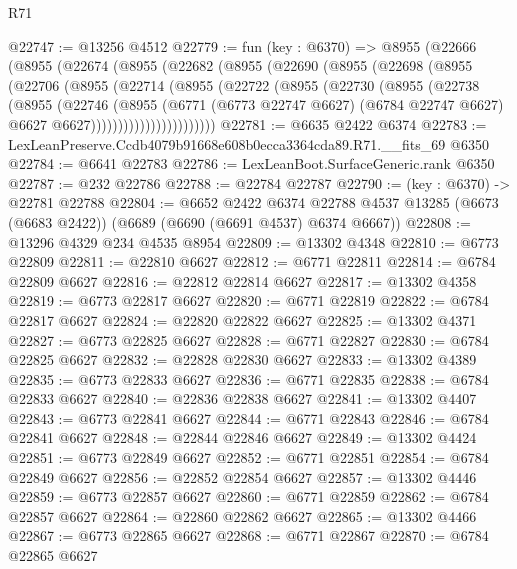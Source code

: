 \begin{lexlean}{R71}
\begin{coremodule}
@22747 := @13256 @4512
@22779 := fun (key : @6370) =>
  @8955
    (@22666
      (@8955
        (@22674
          (@8955
            (@22682
              (@8955
                (@22690
                  (@8955
                    (@22698
                      (@8955
                        (@22706
                          (@8955
                            (@22714
                              (@8955
                                (@22722
                                  (@8955
                                    (@22730
                                      (@8955
                                        (@22738
                                          (@8955
                                            (@22746
                                              (@8955
                                                (@6771
                                                  (@6773 @22747 @6627)
                                                  (@6784 @22747 @6627)
                                                  @6627
                                                  @6627)))))))))))))))))))))))
@22781 := @6635 @2422 @6374
@22783 := LexLeanPreserve.Ccdb4079b91668e608b0ecca3364cda89.R71.__fits_69 @6350
@22784 := @6641 @22783
@22786 := LexLeanBoot.SurfaceGeneric.rank @6350
@22787 := @232 @22786
@22788 := @22784 @22787
@22790 := (key : @6370) -> @22781 @22788
@22804 := @6652
    @2422
    @6374
    @22788
    @4537
    @13285
    (@6673 (@6683 @2422))
    (@6689 (@6690 (@6691 @4537) @6374 @6667))
@22808 := @13296 @4329 @234 @4535 @8954
@22809 := @13302 @4348
@22810 := @6773 @22809
@22811 := @22810 @6627
@22812 := @6771 @22811
@22814 := @6784 @22809 @6627
@22816 := @22812 @22814 @6627
@22817 := @13302 @4358
@22819 := @6773 @22817 @6627
@22820 := @6771 @22819
@22822 := @6784 @22817 @6627
@22824 := @22820 @22822 @6627
@22825 := @13302 @4371
@22827 := @6773 @22825 @6627
@22828 := @6771 @22827
@22830 := @6784 @22825 @6627
@22832 := @22828 @22830 @6627
@22833 := @13302 @4389
@22835 := @6773 @22833 @6627
@22836 := @6771 @22835
@22838 := @6784 @22833 @6627
@22840 := @22836 @22838 @6627
@22841 := @13302 @4407
@22843 := @6773 @22841 @6627
@22844 := @6771 @22843
@22846 := @6784 @22841 @6627
@22848 := @22844 @22846 @6627
@22849 := @13302 @4424
@22851 := @6773 @22849 @6627
@22852 := @6771 @22851
@22854 := @6784 @22849 @6627
@22856 := @22852 @22854 @6627
@22857 := @13302 @4446
@22859 := @6773 @22857 @6627
@22860 := @6771 @22859
@22862 := @6784 @22857 @6627
@22864 := @22860 @22862 @6627
@22865 := @13302 @4466
@22867 := @6773 @22865 @6627
@22868 := @6771 @22867
@22870 := @6784 @22865 @6627

\end{coremodule}
\end{lexlean}
